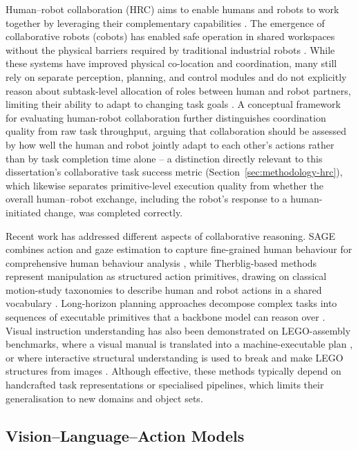 \documentclass[12pt]{article}
\begin{document}
Human--robot collaboration (HRC) aims to enable humans and robots to work together by leveraging their complementary capabilities \cite{ajoudani2018progress}. The emergence of collaborative robots (cobots) has enabled safe operation in shared workspaces without the physical barriers required by traditional industrial robots \cite{robotics8040100}. While these systems have improved physical co-location and coordination, many still rely on separate perception, planning, and control modules and do not explicitly reason about subtask-level allocation of roles between human and robot partners, limiting their ability to adapt to changing task goals \cite{gervasi2020conceptual}. A conceptual framework for evaluating human-robot collaboration further distinguishes coordination quality from raw task throughput, arguing that collaboration should be assessed by how well the human and robot jointly adapt to each other's actions rather than by task completion time alone \cite{gervasi2020conceptual} -- a distinction directly relevant to this dissertation's collaborative task success metric (Section~\ref{sec:methodology-hrc}), which likewise separates primitive-level execution quality from whether the overall human--robot exchange, including the robot's response to a human-initiated change, was completed correctly.

Recent work has addressed different aspects of collaborative reasoning. SAGE combines action and gaze estimation to capture fine-grained human behaviour for comprehensive human behaviour analysis \cite{kuang2025sage}, while Therblig-based methods represent manipulation as structured action primitives, drawing on classical motion-study taxonomies to describe human and robot actions in a shared vocabulary \cite{reinhardt2024therblig}. Long-horizon planning approaches decompose complex tasks into sequences of executable primitives that a backbone model can reason over \cite{Chen_2025}. Visual instruction understanding has also been demonstrated on LEGO-assembly benchmarks, where a visual manual is translated into a machine-executable plan \cite{wang2022translating}, or where interactive structural understanding is used to break and make LEGO structures from images \cite{walsman2022break}. Although effective, these methods typically depend on handcrafted task representations or specialised pipelines, which limits their generalisation to new domains and object sets.

\subsection{Vision--Language--Action Models}
\end{document}
